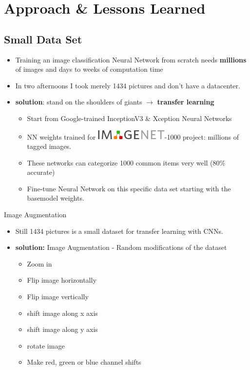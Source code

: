 \documentclass{beamer}
\begin{document}
\section{Approach \& Lessons Learned}


\subsection{Small Data Set}
\begin{frame}
\begin{itemize}
 \item Training an image classification Neural Network from scratch needs \textbf{millions} of images and days to weeks of computation time 
 \item In two afternoons I took merely 1434 pictures and don't have a datacenter.
 \item \textbf{solution}: stand on the shoulders of giants $\rightarrow$ \textbf{transfer learning}
  \begin{itemize}
    \item Start from Google-trained InceptionV3 \& Xception Neural Networks
    \item NN weights trained for \includegraphics[width=0.3\textwidth]{imagenet.jpg}-1000 project: millions of tagged images.
    \item These networks can categorize 1000 common items very well (80\% accurate)
    \item Fine-tune Neural Network on this specific data set starting with the basemodel weights.
  \end{itemize}
\end{itemize}
\end{frame}

\begin{frame}{Image Augmentation}
\begin{itemize}
  \item Still 1434 pictures is a small dataset for transfer learning with CNNs. 
  \item \textbf{solution:} Image Augmentation - Random modifications of the dataset
  \begin{itemize}
	\item Zoom in
	\item Flip image horizontally 
	\item Flip image vertically 
	\item shift image along x axis
	\item shift image along y axis
	\item rotate image 
	\item Make red, green or blue channel shifts
  \end{itemize}
\end{itemize}
\end{frame}
\end{document}
